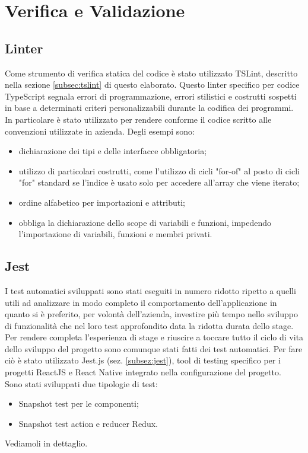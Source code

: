 
\chapter{Verifica e Validazione}\label{chap:tests}
\section{Linter}
Come strumento di verifica statica del codice è stato utilizzato TSLint, descritto nella sezione \ref{subsec:tslint} di questo elaborato. Questo linter specifico per codice TypeScript segnala errori di programmazione, errori stilistici e costrutti sospetti in base a determinati criteri personalizzabili durante la codifica dei programmi.\\
In particolare è stato utilizzato per rendere conforme il codice scritto alle convenzioni utilizzate in azienda. Degli esempi sono:
\begin{itemize}
	\item dichiarazione dei tipi e delle interfacce obbligatoria;
	\item utilizzo di particolari costrutti, come l'utilizzo di cicli "for-of" al posto di cicli "for" standard se l'indice è usato solo per accedere all'array che viene iterato;
	\item ordine alfabetico per importazioni e attributi; 
	\item obbliga la dichiarazione dello scope di variabili e funzioni, impedendo l'importazione di variabili, funzioni e membri privati.
\end{itemize}
\section{Jest}
I test automatici sviluppati sono stati eseguiti in numero ridotto ripetto a quelli utili ad analizzare in modo completo il comportamento dell'applicazione in quanto si è preferito, per volontà dell'azienda, investire più tempo nello sviluppo di funzionalità che nel loro test approfondito data la ridotta durata dello stage. \\
Per rendere completa l'esperienza di stage e riuscire a toccare tutto il ciclo di vita dello sviluppo del progetto sono comunque stati fatti dei test automatici. Per fare ciò è stato utilizzato Jest.js (sez. \ref{subsez:jest}), tool di testing specifico per i progetti ReactJS e React Native integrato nella configurazione del progetto. \\
Sono stati sviluppati due tipologie di test:
\begin{itemize}
	\item Snapshot test per le componenti;
	\item Snapshot test action e reducer Redux.
\end{itemize}
Vediamoli in dettaglio.
